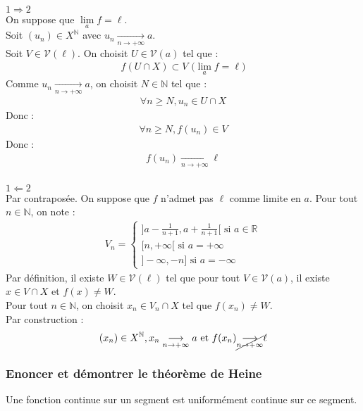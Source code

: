 \documentclass[titlepage, twoside]{report}
\begin{document}
$\boxed{1 \Rightarrow 2}$ \\
On suppose que $\lim\limits_a f = \ell$. \\
Soit $(u_n) \in X^{\mathbb{N}}$ avec $u_n \underset{n \to +\infty}{\longrightarrow} a$. \\
Soit $V \in \mathcal{V}(\ell)$. On choisit $U \in \mathcal{V}(a)$ tel que : 
\begin{align*}
    f(U \cap X) \subset V \text{ ($\lim\limits_a f = \ell$)}
\end{align*}
Comme $u_n \underset{n \to +\infty}{\longrightarrow} a$, on choisit $N \in \mathbb{N}$ tel que : 
\begin{align*}
    \forall n \geq N, u_n \in U \cap X
\end{align*}
Donc : 
\begin{align*}
    \forall n \geq N, f(u_n) \in V
\end{align*}
Donc : 
\begin{align*}
    f(u_n) \underset{n \to +\infty}{\longrightarrow} \ell
\end{align*} \\

$\boxed{1 \Leftarrow 2}$ \\
Par contraposée. On suppose que $f$ n'admet pas $\ell$ comme limite en $a$. Pour tout $n \in \mathbb{N}$, on note : 
\begin{align*}
    V_n = \begin{cases}
        ]a - \frac{1}{n+1}, a + \frac{1}{n+1}[ \text{ si $a \in \mathbb{R}$} \\
        [n, +\infty[ \text{ si $a = +\infty$} \\
        ]-\infty, -n] \text{ si $a = -\infty$}
    \end{cases}
\end{align*}
Par définition, il existe $W \in \mathcal{V}(\ell)$ tel que pour tout $V \in \mathcal{V}(a)$, il existe $x \in V \cap X$ et $f(x) \neq W$. \\
Pour tout $n \in \mathbb{N}$, on choisit $x_n \in V_n \cap X$ tel que $f(x_n) \neq W$. \\
Par construction : 
\begin{align*}
    (x_n) \in X^\mathbb{N}, x_n \underset{n \to +\infty}{\longrightarrow} a \text{ et } f(x_n) \cancel{\underset{n \to +\infty}{\longrightarrow}} \ell
\end{align*}

\subsubsection{Enoncer et démontrer le théorème de Heine}
\begin{tcolorbox}[title=Théorème 15.65, title filled=false, colframe=orange, colback=orange!10!white]
    Une fonction continue sur un segment est uniformément continue sur ce segment. 
\end{tcolorbox}
\end{document}

